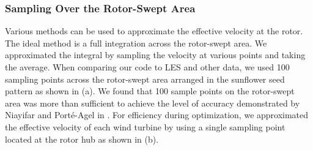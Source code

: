 \documentclass[conf]{new-aiaa}
\begin{document}
\subsubsection{Sampling Over the Rotor-Swept Area}
Various methods can be used to approximate the effective velocity at the rotor. The ideal method is a full integration across the rotor-swept area. We approximated the integral by sampling the velocity at various points and taking the average. 
When comparing our code to LES and other data, we used 100 sampling points across the rotor-swept area arranged in the sunflower seed pattern as shown in (a). We found that 100 sample points on the rotor-swept area was more than sufficient to achieve the level of accuracy demonstrated by Niayifar and Port\'{e}-Agel in \cite{niayifar2016}. For efficiency during optimization, we approximated the effective velocity of each wind turbine by using a single sampling point located at the rotor hub as shown in (b).
\end{document}
